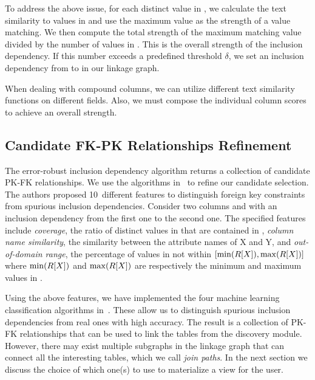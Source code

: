 To address the above issue, for each distinct value in \RX, we calculate the
text similarity to values in \SY and use the maximum value as the strength of a
value matching. We then compute the total strength of the maximum matching value
divided by the number of values in \RX. This is the overall strength of the
inclusion dependency.  If this number exceeds a predefined threshold $\delta$,
we set an inclusion dependency from \RX to \SY in our linkage graph.

When dealing with compound columns, we can utilize different text similarity functions on different fields. 
Also, we must compose the individual column scores to achieve an overall strength.


\subsection{Candidate FK-PK Relationships Refinement}
\label{subsec:refine}


The error-robust inclusion dependency algorithm returns a collection of candidate PK-FK relationships.
We use the algorithms in~\cite{DBLP:conf/webdb/RostinABNL09} 
to refine our candidate selection. The authors proposed 10~different features to distinguish foreign key constraints from spurious inclusion dependencies. Consider two columns \RX and \SY with an inclusion dependency from the first one to the second one. 
The specified features include 
\emph{coverage}, the ratio of distinct values in \RX that are contained in \SY, 
\emph{column name similarity}, the similarity between the attribute names of X and Y, 
and \emph{out-of-domain range}, the percentage of values in \SY not within $[\min(R[X]), \max(R[X])]$ where $\min(R[X])$ and $\max(R[X])$ are respectively the minimum and maximum values in \RX.

Using the above features, we have implemented the four machine learning classification algorithms in~\cite{DBLP:conf/webdb/RostinABNL09}. These allow us to distinguish spurious inclusion dependencies from real ones  with high accuracy.
The result is a collection of PK-FK relationships that can be used to link the tables from the discovery module. However, there may exist multiple subgraphs in the linkage graph that can connect all the interesting tables, which we call \emph{join paths}. In the next section we discuss the choice of which one(s) to use to materialize a view for the user.


